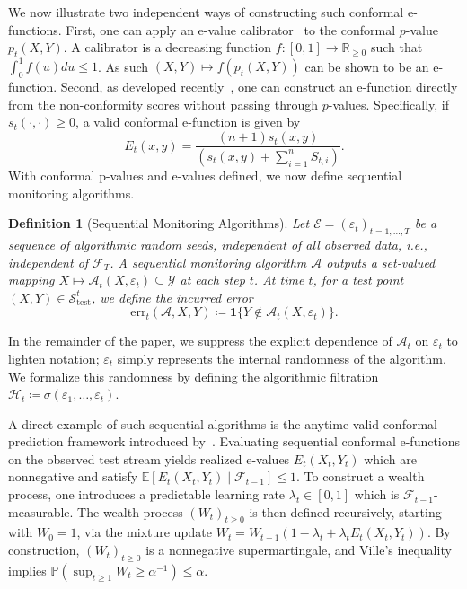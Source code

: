 \documentclass{uai2026} %
\newtheorem{definition}[theorem]{Definition}
\newcommand{\R}{\mathbb{R}}
\newcommand{\1}{\mathbf{1}}
\newcommand{\ind}[1]{\mathbf{1}\{#1\}}
\newcommand{\prob}{\mathbb{P}}
\newcommand{\expec}{\mathbb{E}}
\newcommand{\test}{\mathrm{test}}
\newcommand{\ycal}{\mathcal{Y}}
\newcommand{\scal}{\mathcal{S}}
\renewcommand{\epsilon}{\varepsilon}
\newcommand{\eqdef}{\coloneqq}
\newcommand{\ecal}{\mathcal{E}}
\newcommand{\err}{\mathrm{err}}
\newcommand{\F}{\mathcal{F}}
\newcommand{\scaltest}{\scal_{\test}}
\newcommand{\acal}{\mathcal{A}}
\begin{document}
We now illustrate two independent ways of constructing such conformal e-functions. First, one can apply an e-value calibrator~\citep{vovk2021values} to the conformal $p$-value $p_t(X,Y)$. A calibrator is a decreasing function $f:[0,1]\to\R_{\ge 0}$ such that $\int_0^1 f(u) du \le 1$. As such $(X,Y) \mapsto f(p_t(X,Y))$ can be shown to be an e-function. Second, as developed recently~\citep{balinsky2024enhancing,gauthier2025values}, one can construct an e-function directly from the non-conformity scores without passing through $p$-values. Specifically, if $s_t(\cdot, \cdot) \ge 0$, a valid conformal e-function is given by
\begin{equation*}
  E_t(x, y) = \frac{(n+1)s_t(x,y)}{\left( s_t(x,y) + \sum_{i=1}^n S_{t,i} \right)}.
\end{equation*}
With conformal p-values and e-values defined, we now define sequential monitoring algorithms.

\begin{definition}[Sequential Monitoring Algorithms]
  Let $\ecal = (\epsilon_t)_{t=1,\ldots,T}$ be a sequence of algorithmic random seeds, independent of all observed data, i.e., independent of $\F_T$. A sequential monitoring algorithm $\acal$ outputs a set-valued mapping $X \mapsto \acal_t(X, \epsilon_t) \subseteq \ycal$ at each step $t$. At time $t$, for a test point $(X, Y) \in \scaltest^t$, we define the incurred error
  \begin{equation*}
    \err_t(\acal, X, Y) \eqdef \ind{Y \not\in \acal_t(X,\epsilon_t)}.
  \end{equation*}
\end{definition}

In the remainder of the paper, we suppress the explicit dependence of $\acal_t$ on $\epsilon_t$ to lighten notation; $\epsilon_t$ simply represents the internal randomness of the algorithm. We formalize this randomness by defining the algorithmic filtration $\mathcal{H}_t \eqdef \sigma(\epsilon_1, \dots, \epsilon_t)$. 

A direct example of such sequential algorithms is the anytime-valid conformal prediction framework introduced by~\citet{gauthier2025values}.
Evaluating sequential conformal e-functions on the observed test stream yields realized e-values $E_t(X_t, Y_t)$ which are nonnegative and satisfy $\expec[E_t(X_t, Y_t) \mid \F_{t-1}] \le 1$. To construct a wealth process, one introduces a predictable learning rate $\lambda_t \in [0,1]$ which is $\F_{t-1}$-measurable. The wealth process $(W_t)_{t\ge 0}$ is then defined recursively, starting with $W_0=1$, via the mixture update $W_t = W_{t-1} \left(1 - \lambda_t + \lambda_t E_t(X_t, Y_t)\right)$.
By construction, $(W_t)_{t \ge 0}$ is a nonnegative supermartingale, and Ville's inequality implies $\prob\left(\sup_{t\ge 1} W_t\ge \alpha^{-1}\right)\le \alpha.$
\end{document}
